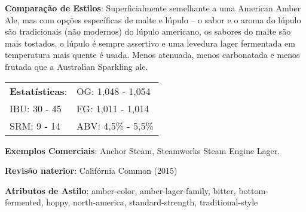 \textbf{Comparação de Estilos}: Superficialmente semelhante a uma American Amber Ale, mas com opções específicas de malte e lúpulo – o sabor e o aroma do lúpulo são tradicionais (não modernos) do lúpulo americano, os sabores do malte são mais tostados, o lúpulo é sempre assertivo e uma levedura lager fermentada em temperatura mais quente é usada. Menos atenuada, menos carbonatada e menos frutada que a Australian Sparkling ale.

\begin{tabular}{@{}p{35mm}p{35mm}@{}}
  \textbf{Estatísticas}: & OG: 1,048 - 1,054 \\
  IBU: 30 - 45  & FG: 1,011 - 1,014  \\
  SRM: 9 - 14  & ABV: 4,5\% - 5,5\%
\end{tabular}

\textbf{Exemplos Comerciais}: Anchor Steam, Steamworks Steam Engine Lager.

\textbf{Revisão naterior}: Califórnia Common (2015)

\textbf{Atributos de Astilo}: amber-color, amber-lager-family, bitter, bottom-fermented, hoppy, north-america, standard-strength, traditional-style

